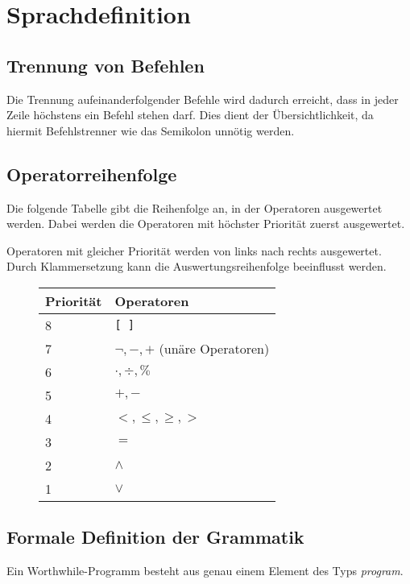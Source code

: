 \section{Sprachdefinition}

\subsection{Trennung von Befehlen}

Die Trennung aufeinanderfolgender Befehle wird dadurch erreicht, dass in jeder Zeile höchstens ein Befehl stehen darf. Dies dient der Übersichtlichkeit, da hiermit Befehlstrenner wie das Semikolon unnötig werden.

\subsection{Operatorreihenfolge}

Die folgende Tabelle gibt die Reihenfolge an, in der Operatoren ausgewertet werden. Dabei werden die Operatoren mit höchster Priorität zuerst ausgewertet.

Operatoren mit gleicher Priorität werden von links nach rechts ausgewertet. Durch Klammersetzung kann die Auswertungsreihenfolge beeinflusst werden.

\begin{figure}[H]
\begin{tabular}{|l|l|}
\hline
\textbf{Priorität} & \textbf{Operatoren} \\
\hline
8 & \texttt{{[}\,{]}} \\
\hline
7 & $\neg, -, +$ (unäre Operatoren)\\
\hline
6 & $\cdot, \div, \%$\\
\hline
5 & $+, -$\\
\hline
4 & $<, \leq, \geq, >$\\
\hline
3 & $=$\\
\hline
2 & $\wedge$ \\
\hline
1 & $\vee$ \\
\hline
\end{tabular}
\end{figure}

\subsection{Formale Definition der Grammatik}

Ein Worthwhile-Programm besteht aus genau einem Element des Typs \textit{program}.

